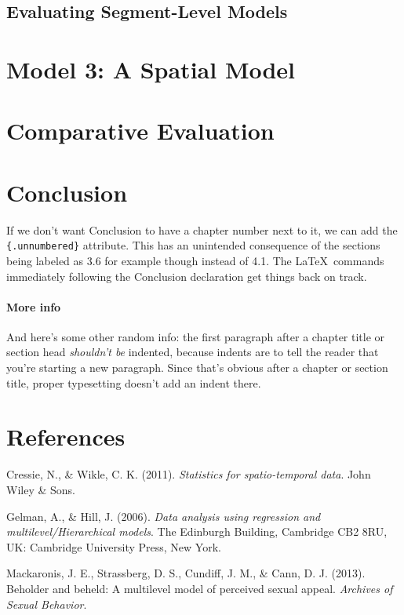 \documentclass[12pt,twoside]{reedthesis}
\begin{document}
  \section{Evaluating Segment-Level
  Models}\label{evaluating-segment-level-models}
  
  \chapter{Model 3: A Spatial Model}\label{model-3-a-spatial-model}
  
  \chapter{Comparative Evaluation}\label{comparative-evaluation}
  
  \chapter*{Conclusion}\label{conclusion}
  
  \setcounter{chapter}{4} \setcounter{section}{0}
  
  If we don't want Conclusion to have a chapter number next to it, we can
  add the \texttt{\{.unnumbered\}} attribute. This has an unintended
  consequence of the sections being labeled as 3.6 for example though
  instead of 4.1. The \LaTeX~commands immediately following the Conclusion
  declaration get things back on track.
  
  \subsubsection{More info}\label{more-info}
  
  And here's some other random info: the first paragraph after a chapter
  title or section head \emph{shouldn't be} indented, because indents are
  to tell the reader that you're starting a new paragraph. Since that's
  obvious after a chapter or section title, proper typesetting doesn't add
  an indent there.
  
  \backmatter
  
  \chapter{References}\label{references}
  
  \noindent
  
  \setlength{\parindent}{-0.20in} \setlength{\leftskip}{0.20in}
  \setlength{\parskip}{8pt}
  
  Cressie, N., \& Wikle, C. K. (2011). \emph{Statistics for
  spatio-temporal data}. John Wiley \& Sons.
  
  Gelman, A., \& Hill, J. (2006). \emph{Data analysis using regression and
  multilevel/Hierarchical models}. The Edinburgh Building, Cambridge CB2
  8RU, UK: Cambridge University Press, New York.
  
  Mackaronis, J. E., Strassberg, D. S., Cundiff, J. M., \& Cann, D. J.
  (2013). Beholder and beheld: A multilevel model of perceived sexual
  appeal. \emph{Archives of Sexual Behavior}.


\end{document}
